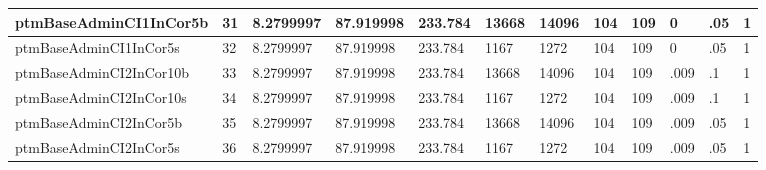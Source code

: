 \begin{tabular}{|l|l|l|l|l|l|l|l|l|l|l|l|}
ptmBaseAdminCI1InCor5b & 31 & 8.2799997 & 87.919998 & 233.784 & 13668 & 14096 & 104 & 109 & 0 & .05 & 1 \\ \hline 
ptmBaseAdminCI1InCor5s & 32 & 8.2799997 & 87.919998 & 233.784 & 1167 & 1272 & 104 & 109 & 0 & .05 & 1 \\ \hline 
ptmBaseAdminCI2InCor10b & 33 & 8.2799997 & 87.919998 & 233.784 & 13668 & 14096 & 104 & 109 & .009 & .1 & 1 \\ \hline 
ptmBaseAdminCI2InCor10s & 34 & 8.2799997 & 87.919998 & 233.784 & 1167 & 1272 & 104 & 109 & .009 & .1 & 1 \\ \hline 
ptmBaseAdminCI2InCor5b & 35 & 8.2799997 & 87.919998 & 233.784 & 13668 & 14096 & 104 & 109 & .009 & .05 & 1 \\ \hline 
ptmBaseAdminCI2InCor5s & 36 & 8.2799997 & 87.919998 & 233.784 & 1167 & 1272 & 104 & 109 & .009 & .05 & 1 \\ \hline 
  \end{tabular}
